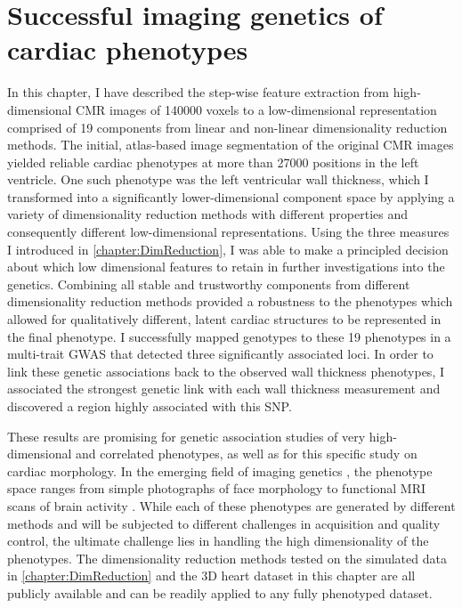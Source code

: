 \newpage
\section{Successful imaging genetics of cardiac phenotypes}
In this chapter, I have described the step-wise feature extraction from high-dimensional CMR images of \num{140000} voxels to a low-dimensional  representation comprised of \num{19} components from linear and non-linear dimensionality reduction methods. The initial, atlas-based image segmentation of the original CMR images yielded reliable cardiac phenotypes at more than \num{27000} positions in the left ventricle. One such phenotype was the left ventricular wall thickness, which I transformed into a significantly lower-dimensional component space by applying a variety of dimensionality reduction methods with different properties and consequently different low-dimensional representations. Using the three measures I introduced in \cref{chapter:DimReduction}, I was able to make a principled decision about which low dimensional features to retain in further investigations into the genetics. Combining all stable and trustworthy components from different dimensionality reduction methods provided a robustness to the phenotypes which allowed for qualitatively different, latent cardiac structures to be represented in the final phenotype. I successfully mapped genotypes to these \num{19} phenotypes in a multi-trait GWAS that detected three significantly associated loci. In order to link these genetic associations back to the observed wall thickness phenotypes, I associated the strongest genetic link with each wall thickness measurement and discovered a region highly associated with this SNP.  

These results are promising for genetic association studies of very high-dimensional and correlated phenotypes, as well as for this specific study on cardiac morphology. In the emerging field of imaging genetics \citep{Ge2014}, the phenotype space ranges from simple photographs of face morphology \citep{Liu2012,Shaffer2016} to  functional MRI scans of brain activity  \citep{Stein2010,Hibar2015}. While each of these phenotypes are generated by different methods and will be subjected to different challenges in acquisition and quality control, the ultimate challenge lies in handling the high dimensionality of the phenotypes. The dimensionality reduction methods tested on the simulated data in \cref{chapter:DimReduction} and the 3D heart dataset in this chapter are all publicly available and can be readily applied to any fully phenotyped dataset. 

